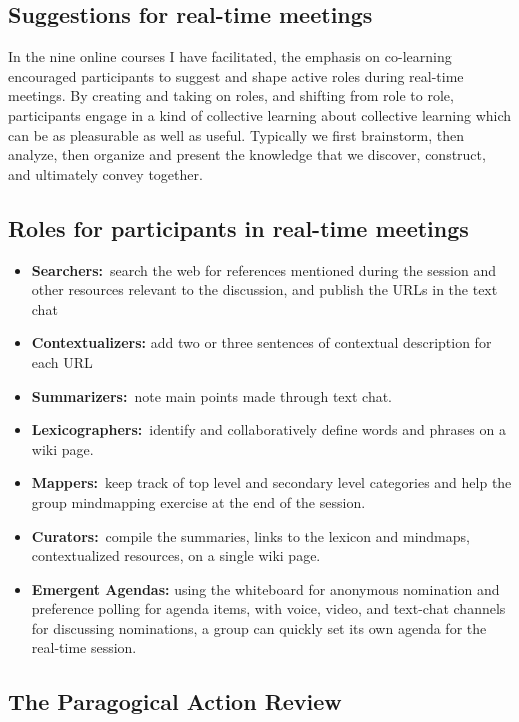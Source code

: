 \subsection{Suggestions for real-time meetings}

In the nine online courses I have facilitated, the emphasis on
co-learning encouraged participants to suggest and shape active roles
during real-time meetings. By creating and taking on roles, and shifting
from role to role, participants engage in a kind of collective learning
about collective learning which can be as pleasurable as well as useful.
Typically we first brainstorm, then analyze, then organize and present
the knowledge that we discover, construct, and ultimately convey
together.

\subsection{Roles for participants in real-time meetings}

\begin{itemize}
\item
  \textbf{Searchers:}~search the web for references mentioned during the
  session and other resources relevant to the discussion, and publish
  the URLs in the text chat
\item
  \textbf{Contextualizers:} add two or three sentences of contextual
  description for each URL
\item
  \textbf{Summarizers:}~note main points made through text chat.
\item
  \textbf{Lexicographers:}~identify and collaboratively define words and
  phrases on a wiki page.
\item
  \textbf{Mappers:}~keep track of top level and secondary level
  categories and help the group mindmapping exercise at the end of the
  session.
\item
  \textbf{Curators:}~compile the summaries, links to the lexicon and
  mindmaps, contextualized resources, on a single wiki page.
\item
  \textbf{Emergent Agendas:} using the whiteboard for anonymous
  nomination and preference polling for agenda items, with voice, video,
  and text-chat channels for discussing nominations, a group can quickly
  set its own agenda for the real-time session.
\end{itemize}

\subsection{The Paragogical Action Review}

